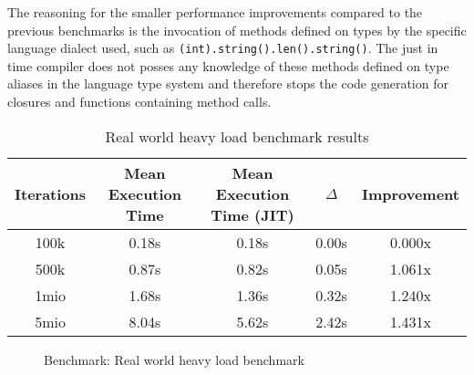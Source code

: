 The reasoning for the smaller performance improvements compared to the previous
benchmarks is the invocation of methods defined on types by the specific
language dialect used, such as \texttt{(int).string().len().string()}. The just
in time compiler does not posses any knowledge of these methods defined on type
aliases in the language type system and therefore stops the code generation for
closures and functions containing method calls.

\begin{table}[H]
    \centering
    \begin{tabular}{c|c|c|c|c}
        Iterations & Mean Execution Time & Mean Execution Time (JIT) & $\Delta$ & Improvement \\ 
        \hline
        100k & 0.18s & 0.18s & 0.00s & 0.000x \\
        500k & 0.87s & 0.82s & 0.05s & 1.061x \\
        1mio & 1.68s & 1.36s & 0.32s & 1.240x \\
        5mio & 8.04s & 5.62s & 2.42s & 1.431x\\
    \end{tabular}
    \label{table:benchmark-realworld}
    \caption{Real world heavy load benchmark results}
\end{table}

\begin{figure}[H]
    \centering
    \caption{Benchmark: Real world heavy load benchmark}
    \label{chart:benchmark-realworld}
\end{figure}

